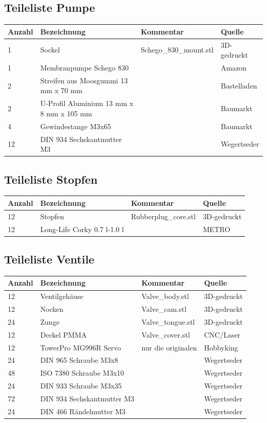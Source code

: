 \documentclass[12pt,letterpaper]{article}
\begin{document}
    \subsection{Teileliste Pumpe}
    \begin{tabular}{|l|l|l|l|}
    \hline
        Anzahl & Bezeichnung & Kommentar & Quelle \\ \hline
        1 & Sockel & Schego\_830\_mount.stl & 3D-gedruckt \\ \hline
        1 & Membranpumpe Schego 830 &  & Amazon \\ \hline
        2 & Streifen aus Moosgummi 13 mm x 70 mm & & Bastelladen \\ \hline
        2 & U-Profil Aluminium 13 mm x 8 mm x 105 mm & & Baumarkt \\ \hline
        4 & Gewindestange M3x65 & ~ & Baumarkt \\ \hline
        12 & DIN 934 Sechskantmutter M3 & ~ & Wegertseder \\ \hline
    \end{tabular}
    
    \subsection{Teileliste Stopfen}
    
    \begin{tabular}{|l|l|l|l|}
    \hline
        Anzahl & Bezeichnung & Kommentar & Quelle \\ \hline
        12 & Stopfen & Rubberplug\_core.stl & 3D-gedruckt \\ \hline
        12 & Long-Life Corky 0.7 l-1.0 l & ~ & METRO \\ \hline
    \end{tabular}
	
	
	\subsection{Teileliste Ventile}
	    \begin{tabular}{|l|l|l|l|}
    \hline
        Anzahl & Bezeichnung & Kommentar & Quelle \\ \hline
        12 & Ventilgehäuse & Valve\_body.stl & 3D-gedruckt \\ \hline
        12 & Nocken & Valve\_cam.stl & 3D-gedruckt \\ \hline
        24 & Zunge & Valve\_tongue.stl & 3D-gedruckt \\ \hline
        12 & Deckel PMMA & Valve\_cover.stl & CNC/Laser \\ \hline
        12 & TowerPro MG996R Servo & nur die originalen & Hobbyking \\ \hline
        24 & DIN 965 Schraube M3x8 & ~ & Wegertseder \\ \hline
        48 & ISO 7380 Schraube M3x10 & ~ & Wegertseder \\ \hline
        24 & DIN 933 Schraube M3x35 & ~ & Wegertseder \\ \hline
        72 & DIN 934 Sechskantmutter M3 & ~ & Wegertseder \\ \hline
        24 & DIN 466 Rändelmutter M3 & ~ & Wegertseder \\ \hline
    \end{tabular}
    
\end{document}
